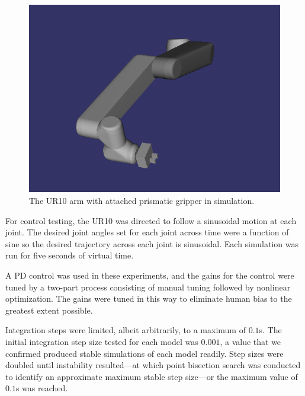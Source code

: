 \documentclass[conference]{IEEEtran}
\begin{document}
\begin{figure}[H]
\includegraphics[width=\linewidth]{UR10Arm.png}
\caption{The UR10 arm with attached prismatic gripper in simulation.\label{fig:UR10Arm}}
\end{figure}
For control testing, the UR10 was directed to follow a sinusoidal motion at each joint. The desired joint angles set for each joint across time were a function of sine so the desired trajectory across each joint is sinusoidal. Each simulation was run for five seconds of virtual time.

A PD control was used in these experiments, and the gains for the control were tuned by a two-part process consisting of manual tuning followed by nonlinear optimization. The gains were tuned in this way to eliminate human bias to the greatest extent possible. 

Integration steps were limited, albeit arbitrarily, to a maximum of $0.1$s. The initial integration step size tested for each model was $0.001$, a value that we confirmed produced stable simulations of each model readily. Step sizes were doubled until instability resulted---at which point bisection search was conducted to identify an approximate maximum stable step size---or the maximum value of $0.1$s was reached.
\end{document}
